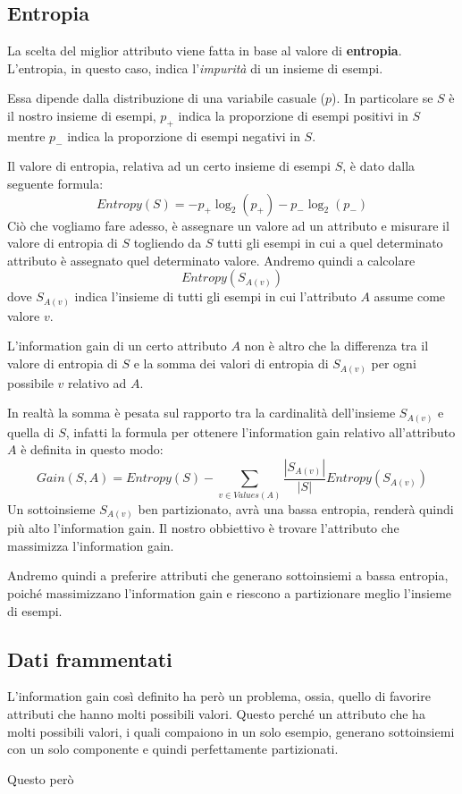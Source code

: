 \subsection{Entropia}
La scelta del miglior attributo viene fatta in base al valore di \textbf{entropia}. L'entropia, in questo caso, indica
l'\emph{impurit\`a} di un insieme di esempi.

Essa dipende dalla distribuzione di una variabile casuale ($p$). In particolare se $S$ \`e il nostro insieme di esempi,
$p_+$ indica la proporzione di esempi positivi in $S$ mentre $p_-$ indica la proporzione di esempi negativi in $S$.

Il valore di entropia, relativa ad un certo insieme di esempi $S$, \`e dato dalla seguente formula:
\[ Entropy(S) = -p_+ \log_2{(p_+)} - p_- \log_2{(p_-)} \]
Ci\`o che vogliamo fare adesso, \`e assegnare un valore ad un attributo e misurare il valore di entropia di $S$
togliendo da $S$ tutti gli esempi in cui a quel determinato attributo \`e assegnato quel determinato valore. Andremo
quindi a calcolare
\[ Entropy(S_{A(v)}) \]
dove $S_{A(v)}$ indica l'insieme di tutti gli esempi in cui l'attributo $A$ assume come valore $v$.

L'information gain di un certo attributo $A$ non \`e altro che la differenza tra il valore di entropia di $S$ e la
somma dei valori di entropia di $S_{A(v)}$ per ogni possibile $v$ relativo ad $A$.

In realt\`a la somma \`e pesata sul rapporto tra la cardinalit\`a dell'insieme $S_{A(v)}$ e quella di $S$, infatti
la formula per ottenere l'information gain relativo all'attributo $A$ \`e definita in questo modo:
\[ Gain(S, A) = Entropy(S) - \sum_{v \in Values(A)} \frac{|S_{A(v)}|}{|S|} Entropy(S_{A(v)}) \]
Un sottoinsieme $S_{A(v)}$ ben partizionato, avr\`a una bassa entropia, render\`a quindi pi\`u alto l'information gain.
Il nostro obbiettivo \`e trovare l'attributo che massimizza l'information gain.

Andremo quindi a preferire attributi che generano sottoinsiemi a bassa entropia, poich\'e massimizzano l'information
gain e riescono a partizionare meglio l'insieme di esempi.

\subsection{Dati frammentati}
L'information gain cos\`i definito ha per\`o un problema, ossia, quello di favorire attributi che hanno molti possibili
valori. Questo perch\'e un attributo che ha molti possibili valori, i quali compaiono in un solo esempio, generano 
sottoinsiemi con un solo componente e quindi perfettamente partizionati.

Questo per\`o 